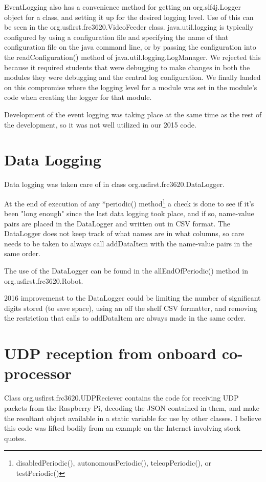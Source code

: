 \documentclass[]{article}
\begin{document}
EventLogging also has a convenience method for getting an org.slf4j.Logger object for a class, and setting it up for the desired logging level.
Use of this can be seen in the org.usfirst.frc3620.VideoFeeder class.
java.util.logging is typically configured by using a configuration file and specifying the name of that configuration file on the java command line, or by passing the configuration into the readConfiguration() method of java.util.logging.LogManager.
We rejected this because it required students that were debugging to make changes in both the modules they were debugging and the central log configuration.
We finally landed on this compromise where the logging level for a module was set in the module's code when creating the logger for that module.

Development of the event logging was taking place at the same time as the rest of the development, so it was not well utilized in our 2015 code.

\section {Data Logging}

Data logging was taken care of in class org.usfirst.frc3620.DataLogger.

At the end of execution of any *periodic() method\footnote{disabledPeriodic(), autonomousPeriodic(), teleopPeriodic(), or testPeriodic()} a check is done to see if it's been "long enough" since the last data logging took place, and if so, name-value pairs are placed in the DataLogger and written out in CSV format.
The DataLogger does not keep track of what names are in what columns, so care needs to be taken to always call addDataItem with the name-value pairs in the same order. 

The use of the DataLogger can be found in the allEndOfPeriodic() method in org.usfirst.frc3620.Robot.

2016 improvemenst to the DataLogger could be limiting the number of significant digits stored (to save space), using an off the shelf CSV formatter, and removing the restriction that calls to addDataItem are always made in the same order.

\section {UDP reception from onboard co-processor}

Class org.usfirst.frc3620.UDPReciever contains the code for receiving UDP packets from the Raspberry Pi, decoding the JSON contained in them, and make the resultant object available in a static variable for use by other classes.
I believe this code was lifted bodily from an example on the Internet involving stock quotes.
\end{document}
